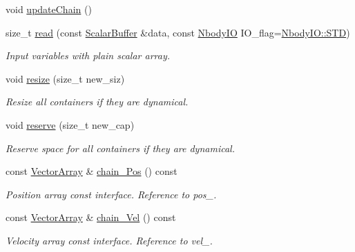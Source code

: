 \begin{DoxyCompactItemize}
void \mbox{\hyperlink{class_space_h_1_1_vel_indep_chain_particles_a06d1ed1c4eaef6229aabf5ad3f2de45d}{update\+Chain}} ()
\item 
size\+\_\+t \mbox{\hyperlink{class_space_h_1_1_vel_indep_chain_particles_a60778581313c992696314625eb2b30cf}{read}} (const \mbox{\hyperlink{class_space_h_1_1_vel_indep_particles_abca40159a816385790d5a6fd19c1dc6d}{Scalar\+Buffer}} \&data, const \mbox{\hyperlink{namespace_space_h_a296a8bae763a754564bfdce216e31b59}{Nbody\+IO}} I\+O\+\_\+flag=\mbox{\hyperlink{namespace_space_h_a296a8bae763a754564bfdce216e31b59ac6ce23be5d350ce18a665427d2d950f7}{Nbody\+I\+O\+::\+S\+TD}})
\begin{DoxyCompactList}\small\item\em Input variables with plain scalar array. \end{DoxyCompactList}\item 
void \mbox{\hyperlink{class_space_h_1_1_vel_indep_chain_particles_afdf6136619e4be707bed1e9859bc7171}{resize}} (size\+\_\+t new\+\_\+siz)
\begin{DoxyCompactList}\small\item\em Resize all containers if they are dynamical. \end{DoxyCompactList}\item 
void \mbox{\hyperlink{class_space_h_1_1_vel_indep_chain_particles_a9a6b23671b53391cded80cde58b18608}{reserve}} (size\+\_\+t new\+\_\+cap)
\begin{DoxyCompactList}\small\item\em Reserve space for all containers if they are dynamical. \end{DoxyCompactList}\item 
const \mbox{\hyperlink{class_space_h_1_1_vel_indep_particles_aa9983058940249df8b00fa800e8cbad2}{Vector\+Array}} \& \mbox{\hyperlink{class_space_h_1_1_vel_indep_chain_particles_a2dd7d2f703141d0ef3d8728b2a57cb83}{chain_\+Pos}} () const
\begin{DoxyCompactList}\small\item\em Position array const interface. Reference to pos\+\_\+. \end{DoxyCompactList}\item 
const \mbox{\hyperlink{class_space_h_1_1_vel_indep_particles_aa9983058940249df8b00fa800e8cbad2}{Vector\+Array}} \& \mbox{\hyperlink{class_space_h_1_1_vel_indep_chain_particles_a741064afd96c861eac50e8de239eedaa}{chain_\+Vel}} () const
\begin{DoxyCompactList}\small\item\em Velocity array const interface. Reference to vel\+\_\+. \end{DoxyCompactList}\item 

\end{DoxyCompactItemize}
